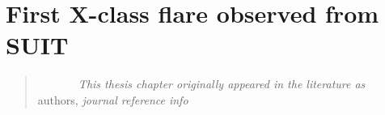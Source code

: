 \documentclass[plain]{hvdthesis}
\begin{document}
\chapter{First X-class flare observed from SUIT}\label{c:chap8}
\begin{quote}
{\em ~~~~~~~This thesis chapter originally appeared in the literature as} \\
{authors,
{\em journal reference info}}
\end{quote}

\clearpage
%

\singlespace


\end{document}
